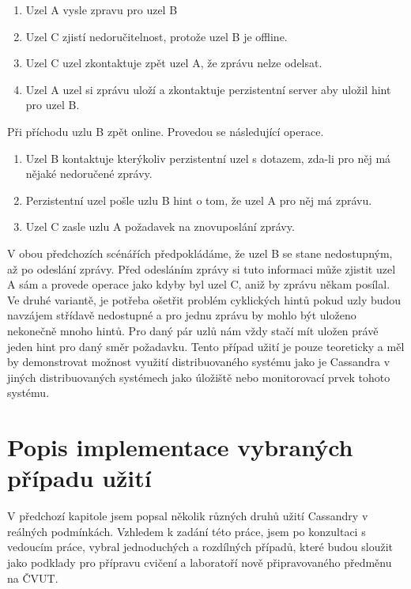 \documentclass[thesis=M,czech]{FITthesis}[2012/06/26]
\begin{document}
\begin{enumerate}
\item Uzel A vysle zpravu pro uzel B
\item Uzel C zjistí nedoručitelnost, protože uzel B je offline.
\item Uzel C uzel zkontaktuje zpět uzel A, že zprávu nelze odelsat.
\item Uzel A uzel si zprávu uloží a zkontaktuje perzistentní server aby uložil hint pro uzel B.

\end{enumerate}

Při příchodu uzlu B zpět online. Provedou se následující operace.

\begin{enumerate}
\item Uzel B kontaktuje kterýkoliv perzistentní uzel s dotazem, zda-li pro něj má nějaké nedoručené zprávy.
\item Perzistentní uzel pošle uzlu B hint o tom, že uzel A pro něj má zprávu. 
\item Uzel C zasle uzlu A požadavek na znovuposlání zprávy.
\end{enumerate}


V obou předchozích scénářích předpokládáme, že uzel B se stane nedostupným, až po odeslání zprávy. Před odesláním zprávy si tuto informaci může zjistit uzel A sám a provede operace jako kdyby byl uzel C, aniž by zprávu někam posílal. Ve druhé variantě, je potřeba ošetřit problém cyklických hintů pokud uzly budou navzájem střídavě nedostupné a pro jednu zprávu by mohlo být uloženo nekonečně mnoho hintů. Pro daný pár uzlů nám vždy stačí mít uložen právě jeden hint pro daný směr požadavku. Tento případ užití je pouze teoreticky a měl by demonstrovat možnost využití distribuovaného systému jako je Cassandra v jiných distribuovaných systémech jako úložiště nebo monitorovací prvek tohoto systému. 


\chapter{Popis implementace vybraných případu užití}
V předchozí kapitole jsem popsal několik různých druhů užití Cassandry v reálných podmínkách. Vzhledem k zadání této práce, jsem po konzultaci s vedoucím práce, vybral jednoduchých a rozdílných případů, které budou sloužit jako podklady pro přípravu cvičení a laboratoří nově připravovaného předměnu na ČVUT.
\end{document}
